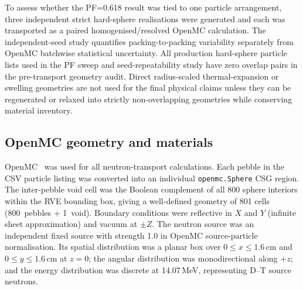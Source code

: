 \documentclass[preprint,12pt]{elsarticle}
\begin{document}
To assess whether the PF=0.618 result was tied to one particle arrangement,
three independent strict hard-sphere realisations were generated and each was
transported as a paired homogenised/resolved OpenMC calculation.  The
independent-seed study quantifies packing-to-packing variability separately
from OpenMC batchwise statistical uncertainty.  All production hard-sphere
particle lists used in the PF sweep and seed-repeatability study have zero
overlap pairs in the pre-transport geometry audit.  Direct radius-scaled
thermal-expansion or swelling geometries are not used for the final physical
claims unless they can be regenerated or relaxed into strictly non-overlapping
geometries while conserving material inventory.

\subsection{OpenMC geometry and materials}

OpenMC~\cite{romano2015} was used for all neutron-transport calculations.
Each pebble in the CSV particle listing was converted into an individual
\texttt{openmc.Sphere} CSG region.  The inter-pebble void cell was the Boolean
complement of all 800 sphere interiors within the RVE bounding box, giving a
well-defined geometry of 801 cells (800~pebbles + 1~void).  Boundary conditions
were reflective in $X$ and $Y$ (infinite sheet approximation) and vacuum at
$\pm Z$.  The neutron source was an independent fixed source with strength
1.0 in OpenMC source-particle normalisation.  Its spatial distribution was a
planar box over $0\leq x\leq1.6$\,cm and $0\leq y\leq1.6$\,cm at $z=0$; the
angular distribution was monodirectional along $+z$; and the energy
distribution was discrete at 14.07\,MeV, representing D--T source neutrons.
\end{document}
